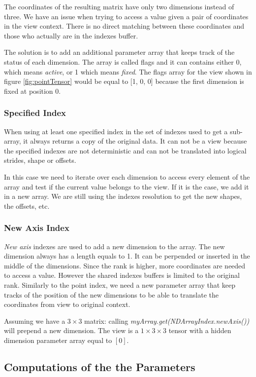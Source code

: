 The coordinates of the resulting matrix have only two dimensions instead of three. We have an issue when trying to access a value given a pair of coordinates in the view context. There is no direct matching between these coordinates and those who actually are in the indexes buffer. 

The solution is to add an additional parameter array that keeps track of the status of each dimension. 
The array is called flags and it can contains either 0, which means \textit{active}, or 1 which means \textit{fixed}. The flags array for the view shown in figure \ref{fig:pointTensor} would be equal to [1, 0, 0] because the first dimension is fixed at position 0.

\subsubsection{Specified Index}
When using at least one specified index in the set of indexes used to get a sub-array, it always returns a copy of the original data. It can not be a view because the specified indexes are not deterministic and can not be translated into logical strides, shape or offsets.

In this case we need to iterate over each dimension to access every element of the array and test if the current value belongs to the view. If it is the case, we add it in a new array. We are still using the indexes resolution to get the new shapes, the offsets, etc.


\subsubsection{New Axis Index}
\textit{New axis} indexes are used to add a new dimension to the array. The new dimension always has a length equals to 1. It can be perpended or inserted in the middle of the dimensions.
Since the rank is higher, more coordinates are needed to access a value. However the shared indexes buffers is limited to the original rank. Similarly to the point index, we need a new parameter array that keep tracks of the position of the new dimensions to be able to  translate the coordinates from view to original context.

Assuming we have a $3\times 3$ matrix: calling \textit{myArray.get(NDArrayIndex.newAxis())} will prepend a new dimension. The view is a $1\times 3\times 3$ tensor with a hidden dimension parameter array equal to $[0]$.


\subsection{Computations of the the Parameters}
